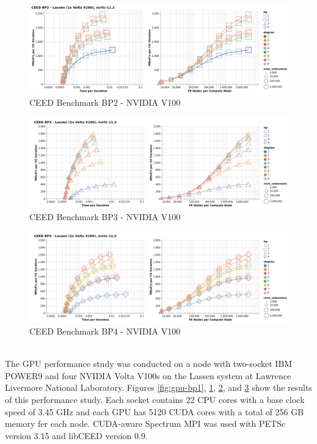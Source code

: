 \begin{figure}[ht!]
\includegraphics[width=.99\linewidth]{../img/cudaGenBP2Clip}
\caption{CEED Benchmark BP2 - NVIDIA V100}
\label{fig:gpu-bp2}
\end{figure}

\begin{figure}[ht!]
\includegraphics[width=.99\linewidth]{../img/cudaGenBP3Clip}
\caption{CEED Benchmark BP3 - NVIDIA V100}
\label{fig:gpu-bp3}
\end{figure}

\begin{figure}[ht!]
\includegraphics[width=.99\linewidth]{../img/cudaGenBP4Clip}
\caption{CEED Benchmark BP4 - NVIDIA V100}
\label{fig:gpu-bp4}
\end{figure}

~\\
The GPU performance study was conducted on a node with two-socket IBM POWER9 and four NVIDIA Volta V100s on the Lassen system at Lawrence Livermore National Laboratory.
Figures \ref{fig:gpu-bp1}, \ref{fig:gpu-bp2}, \ref{fig:gpu-bp3}, and \ref{fig:gpu-bp4} show the results of this performance study.
Each socket contains 22 CPU cores with a base clock speed of 3.45 GHz and each GPU has 5120 CUDA cores with a total of 256 GB memory fer each node.
CUDA-aware Spectrum MPI was used with PETSc \cite{petsc-user-ref} version 3.15 and libCEED \cite{libceed} version 0.9.

